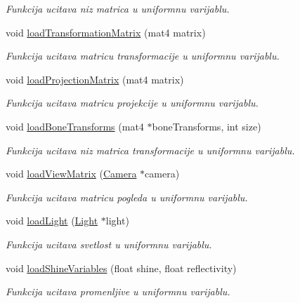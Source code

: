 \begin{DoxyCompactItemize}
\begin{DoxyCompactList}\small\item\em Funkcija ucitava niz matrica u uniformnu varijablu. \end{DoxyCompactList}\item 
void \hyperlink{classshader_1_1AnimatedModelShader_a526fd5aa462d017b6a187ae71132bd74}{load\+Transformation\+Matrix} (mat4 matrix)
\begin{DoxyCompactList}\small\item\em Funkcija ucitava matricu transformacije u uniformnu varijablu. \end{DoxyCompactList}\item 
void \hyperlink{classshader_1_1AnimatedModelShader_af6a7c16d179ba1610968feb9a41a81f9}{load\+Projection\+Matrix} (mat4 matrix)
\begin{DoxyCompactList}\small\item\em Funkcija ucitava matricu projekcije u uniformnu varijablu. \end{DoxyCompactList}\item 
void \hyperlink{classshader_1_1AnimatedModelShader_a6eaa2eee5a75b0c26216cd9308d060d5}{load\+Bone\+Transforms} (mat4 $\ast$bone\+Transforms, int size)
\begin{DoxyCompactList}\small\item\em Funkcija ucitava niz matrica transformacije u uniformnu varijablu. \end{DoxyCompactList}\item 
void \hyperlink{classshader_1_1AnimatedModelShader_a9a91e6dbe9edd8a25492b8b0974d5c92}{load\+View\+Matrix} (\hyperlink{classentity_1_1Camera}{Camera} $\ast$camera)
\begin{DoxyCompactList}\small\item\em Funkcija ucitava matricu pogleda u uniformnu varijablu. \end{DoxyCompactList}\item 
void \hyperlink{classshader_1_1AnimatedModelShader_afd3052de306b1febcde74aa86d166a27}{load\+Light} (\hyperlink{classentity_1_1Light}{Light} $\ast$light)
\begin{DoxyCompactList}\small\item\em Funkcija ucitava svetlost u uniformnu varijablu. \end{DoxyCompactList}\item 
void \hyperlink{classshader_1_1AnimatedModelShader_a4511391e6fb609b5f1207c3b5b7b567f}{load\+Shine\+Variables} (float shine, float reflectivity)
\begin{DoxyCompactList}\small\item\em Funkcija ucitava promenljive u uniformnu varijablu. \end{DoxyCompactList}\item 

\end{DoxyCompactItemize}
